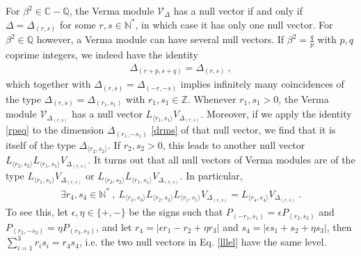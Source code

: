 \documentclass[12pt, a4paper]{article}
\theoremstyle{break}
\begin{document}
For $\beta^2\in\mathbb{C}-\mathbb{Q}$, the Verma module $\mathcal{V}_\Delta$ has a null vector if and only if $\Delta=\Delta_{(r, s)}$ for some $r,s\in\mathbb{N}^*$, in which case it has only one null vector. For $\beta^2\in\mathbb{Q}$ however, a Verma module can have several null vectors. If $\beta^2 = \frac{q}{p}$ with $p,q$ coprime integers, we indeed have the identity
\begin{align}
 \Delta_{(r+p,s+q)} = \Delta_{(r,s)}\ ,
 \label{rpsq}
\end{align}
which together with $\Delta_{(r,s)}=\Delta_{(-r,-s)}$ implies infinitely many coincidences of the type $\Delta_{(r,s)}=\Delta_{(r_1,s_1)}$ with $r_1,s_1\in\mathbb{Z}$. 
Whenever $r_1,s_1>0$, the Verma module $\mathcal{V}_{\Delta_{(r,s)}}$ has a null vector $L_{\langle r_1,s_1\rangle} V_{\Delta_{(r,s)}}$. 
Moreover, if we apply the identity \eqref{rpsq} to the dimension $\Delta_{(r_1,-s_1)}$ \eqref{drms} of that null vector, we find that it is itself of the type $\Delta_{\langle r_2,s_2\rangle}$. If $r_2,s_2>0$, this leads to another null vector $L_{\langle r_2,s_2\rangle}L_{\langle r_1,s_1\rangle} V_{\Delta_{(r,s)}}$. It turns out that all null vectors of Verma modules are of the type $L_{\langle r_1,s_1\rangle} V_{\Delta_{(r,s)}}$ or $L_{\langle r_2,s_2\rangle}L_{\langle r_1,s_1\rangle} V_{\Delta_{(r,s)}}$. In particular,
\begin{align}
 \exists r_4,s_4\in \mathbb{N}^*\ , \ L_{\langle r_3,s_3\rangle}L_{\langle r_2,s_2\rangle}L_{\langle r_1,s_1\rangle} V_{\Delta_{(r,s)}} = L_{\langle r_4,s_4\rangle} V_{\Delta_{(r,s)}}\ .
 \label{lllel}
\end{align}
To see this, let $\epsilon,\eta\in\{+,-\}$ be the signs such that $P_{(-r_1,s_1)}=\epsilon P_{(r_2,s_2)}$ and $P_{(r_2,-s_2)}=\eta P_{(r_3,s_3)}$, and let $r_4=|\epsilon r_1-r_2+\eta r_3|$ and $s_4=|\epsilon s_1+s_2+\eta s_3|$, then $\sum_{i=1}^3 r_is_i=r_4s_4$, i.e. the two null vectors in Eq. \eqref{lllel} have the same level. 
\end{document}
